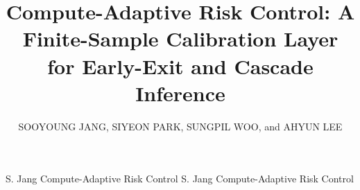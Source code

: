 \documentclass{ieeeaccess}
\begin{document}
\history{}
\doi{}

\title{Compute-Adaptive Risk Control: A Finite-Sample Calibration Layer for Early-Exit and Cascade Inference}

\author{\uppercase{Sooyoung Jang},
\uppercase{Siyeon Park},
\uppercase{Sungpil Woo}, and
\uppercase{Ahyun Lee}}

\address[1]{Department of Computer Engineering, Hanbat National University,
Daejeon 34158, Republic of Korea (e-mail: syjang@hanbat.ac.kr; woosungpil@hanbat.ac.kr)}
\address[2]{Department of Intelligent Media Engineering, Hanbat National University,
Daejeon 34158, Republic of Korea (e-mail: worksiyeon@gmail.com; ahyun@hanbat.ac.kr)}

\markboth
{S. Jang \headeretal{} Compute-Adaptive Risk Control}
{S. Jang \headeretal{} Compute-Adaptive Risk Control}

\end{document}
